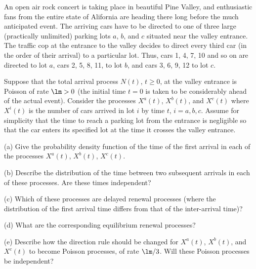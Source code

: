 \vspace{2mm}

\qcutline


\begin{exercise}
An open air rock concert is taking place in beautiful Pine Valley, and enthusiastic fans from the entire state of Alifornia are heading there long before the much anticipated event. The arriving cars have to be directed to one of three large (practically unlimited) parking lots $a$, $b$, and $c$ situated near the valley entrance. The traffic cop at the entrance to the valley decides to direct every third car (in the order of their arrival) to a particular lot. Thus, cars 1, 4, 7, 10 and so on are directed to lot $a$, cars 2, 5, 8, 11, to lot $b$, and cars 3, 6, 9, 12 to lot $c$.

Suppose that the total arrival process $N(t)$, $t \geq  0$, at the valley entrance is Poisson of rate $\lm  > 0$ (the initial time $t = 0$ is taken to be considerably ahead of the actual event). Consider the processes $X^a(t)$, $X^b(t)$, and $X^c(t)$ where $X^i(t)$ is the number of cars arrived in lot $i$
by time $t$, $i = a, b, c$. Assume for simplicity that the time to reach a parking lot from the entrance is negligible so that the car enters its specified lot at the time it crosses the valley entrance.
\ben
\item [(a)] Give the probability density function of the time of the first arrival in each of the processes $X^a(t)$, $X^b(t)$, $X^c(t)$.
\item [(b)] Describe the distribution of the time between two subsequent arrivals in each of these processes. Are these times independent?
\item [(c)] Which of these processes are delayed renewal processes (where the distribution of the first arrival time differs from that of the inter-arrival time)?
\item [(d)] What are the corresponding equilibrium renewal processes?
\item [(e)] Describe how the direction rule should be changed for $X^a(t)$, $X^b(t)$, and $X^c(t)$ to become Poisson processes, of rate $\lm /3$. Will these Poisson processes be independent?
\een
\end{exercise}


